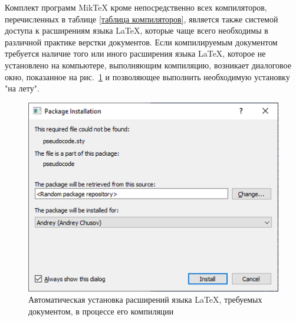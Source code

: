\documentclass[report, draught]{fefudoc}
\begin{document}
Комплект программ MikTeX кроме непосредственно всех компиляторов, перечисленных в таблице \ref{таблица компиляторов}, является также системой доступа к расширениям языка \LaTeX{}, которые чаще всего необходимы в различной практике верстки документов.
Если компилируемым документом требуется наличие того или иного расширения языка \LaTeX, которое не установлено на компьютере, выполняющим компиляцию, возникает диалоговое окно, показанное на рис.~\ref{автоустановка расширений miktex} и позволяющее выполнить необходимую установку "на лету".

\begin{figure}[ht]
\centering
\includegraphics{workbook-extras/miktex-package-installation}
\caption{Автоматическая установка расширений языка \LaTeX, требуемых документом, в процессе его компиляции}
\label{автоустановка расширений miktex}
\end{figure}
\end{document}
